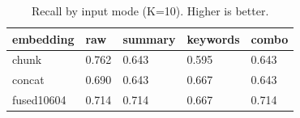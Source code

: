 \begin{table}
\caption{Recall by input mode (K=10). Higher is better.}
\label{tab:recall-by-mode}
\begin{tabular}{lllll}
\toprule
embedding & raw & summary & keywords & combo \\
\midrule
chunk & 0.762 & 0.643 & 0.595 & 0.643 \\
concat & 0.690 & 0.643 & 0.667 & 0.643 \\
fused10604 & 0.714 & 0.714 & 0.667 & 0.714 \\
\bottomrule
\end{tabular}
\end{table}
